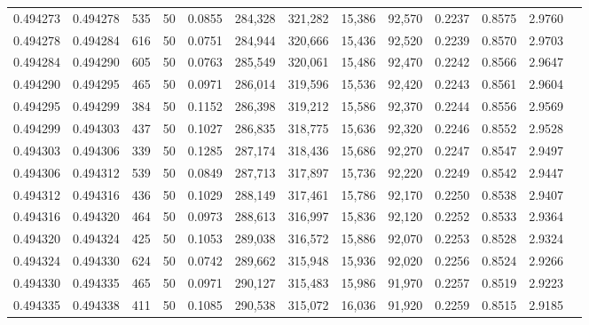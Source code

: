 \begin{tabular}{rrrrrrrrrrrrr}
0.494273 & 0.494278 &   535 &  50 &                                     0.0855 & 284,328 & 321,282 &  15,386 &  92,570 & 0.2237 & 0.8575 & 2.9760 \\
0.494278 & 0.494284 &   616 &  50 &                                     0.0751 & 284,944 & 320,666 &  15,436 &  92,520 & 0.2239 & 0.8570 & 2.9703 \\
0.494284 & 0.494290 &   605 &  50 &                                     0.0763 & 285,549 & 320,061 &  15,486 &  92,470 & 0.2242 & 0.8566 & 2.9647 \\
0.494290 & 0.494295 &   465 &  50 &                                     0.0971 & 286,014 & 319,596 &  15,536 &  92,420 & 0.2243 & 0.8561 & 2.9604 \\
0.494295 & 0.494299 &   384 &  50 &                                     0.1152 & 286,398 & 319,212 &  15,586 &  92,370 & 0.2244 & 0.8556 & 2.9569 \\
0.494299 & 0.494303 &   437 &  50 &                                     0.1027 & 286,835 & 318,775 &  15,636 &  92,320 & 0.2246 & 0.8552 & 2.9528 \\
0.494303 & 0.494306 &   339 &  50 &                                     0.1285 & 287,174 & 318,436 &  15,686 &  92,270 & 0.2247 & 0.8547 & 2.9497 \\
0.494306 & 0.494312 &   539 &  50 &                                     0.0849 & 287,713 & 317,897 &  15,736 &  92,220 & 0.2249 & 0.8542 & 2.9447 \\
0.494312 & 0.494316 &   436 &  50 &                                     0.1029 & 288,149 & 317,461 &  15,786 &  92,170 & 0.2250 & 0.8538 & 2.9407 \\
0.494316 & 0.494320 &   464 &  50 &                                     0.0973 & 288,613 & 316,997 &  15,836 &  92,120 & 0.2252 & 0.8533 & 2.9364 \\
0.494320 & 0.494324 &   425 &  50 &                                     0.1053 & 289,038 & 316,572 &  15,886 &  92,070 & 0.2253 & 0.8528 & 2.9324 \\
0.494324 & 0.494330 &   624 &  50 &                                     0.0742 & 289,662 & 315,948 &  15,936 &  92,020 & 0.2256 & 0.8524 & 2.9266 \\
0.494330 & 0.494335 &   465 &  50 &                                     0.0971 & 290,127 & 315,483 &  15,986 &  91,970 & 0.2257 & 0.8519 & 2.9223 \\
0.494335 & 0.494338 &   411 &  50 &                                     0.1085 & 290,538 & 315,072 &  16,036 &  91,920 & 0.2259 & 0.8515 & 2.9185 \\

\end{tabular}
